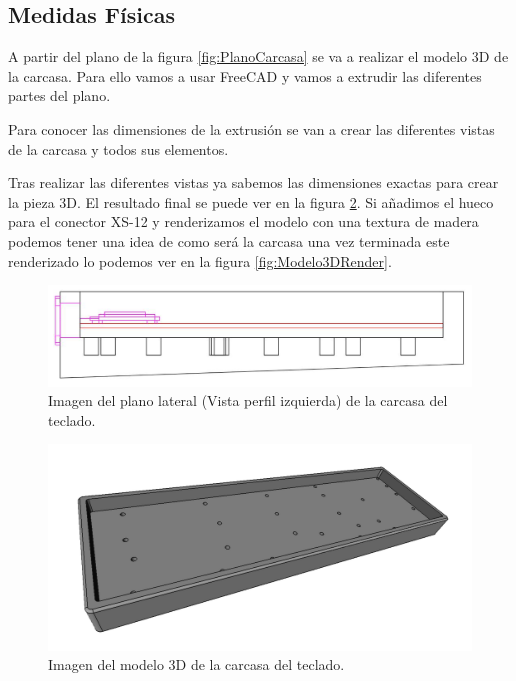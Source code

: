 \subsection{Medidas Físicas}
A partir del plano de la figura \ref{fig:PlanoCarcasa} se va a realizar el modelo 3D de la carcasa. Para ello vamos a usar FreeCAD y vamos a extrudir las diferentes partes del plano.

Para conocer las dimensiones de la extrusión se van a crear las diferentes vistas de la carcasa y todos sus elementos.

Tras realizar las diferentes vistas ya sabemos las dimensiones exactas para crear la pieza 3D. El resultado final se puede ver en la figura \ref{fig:Modelo3D}. Si añadimos el hueco para el conector XS-12 y renderizamos el modelo con una textura de madera podemos tener una idea de como será la carcasa una vez terminada este renderizado lo podemos ver en la figura \ref{fig:Modelo3DRender}.

\begin{figure}[H]
    \centering
    \includegraphics[width=1\textwidth]{imagenes/Capitulos/Cap06/PlanoCarcasaVistaLateral.png}
    \caption{Imagen del plano lateral (Vista perfil izquierda) de la carcasa del teclado.}
    \label{fig:PlanoCarcasaVistaLateral}
\end{figure}

\begin{figure}[H]
    \centering
    \includegraphics[width=1\textwidth]{imagenes/Capitulos/Cap06/Modelo3D.png}
    \caption{Imagen del modelo 3D de la carcasa del teclado.}
    \label{fig:Modelo3D}
\end{figure}

